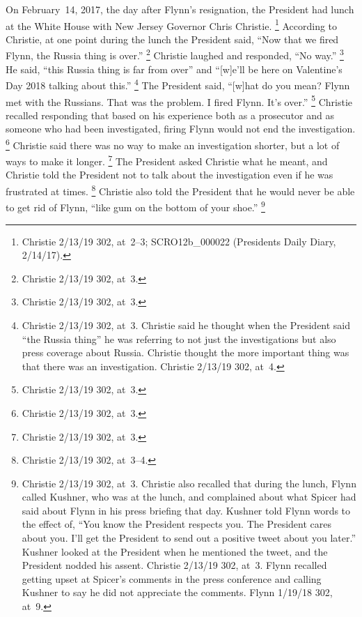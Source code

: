 On February~14, 2017, the day after Flynn's resignation, the President had lunch at the White House with New Jersey Governor Chris Christie.%
\footnote{Christie 2/13/19 302, at~2--3;
SCRO12b\_000022 (Presidents Daily Diary, 2/14/17).}
According to Christie, at one point during the lunch the President said, ``Now that we fired Flynn, the Russia thing is over.''%
\footnote{Christie 2/13/19 302, at~3.}
Christie laughed and responded, ``No way.''%
\footnote{Christie 2/13/19 302, at~3.}
He said, ``this Russia thing is far from over'' and ``[w]e'll be here on Valentine's Day 2018 talking about this.''%
\footnote{Christie 2/13/19 302, at~3.
Christie said he thought when the President said ``the Russia thing'' he was referring to not just the investigations but also press coverage about Russia.
Christie thought the more important thing was that there was an investigation.
Christie 2/13/19 302, at~4.}
The President said, ``[w]hat do you mean?
Flynn met with the Russians.
That was the problem.
I fired Flynn.
It's over.''%
\footnote{Christie 2/13/19 302, at~3.}
Christie recalled responding that based on his experience both as a prosecutor and as someone who had been investigated, firing Flynn would not end the investigation.%
\footnote{Christie 2/13/19 302, at~3.}
Christie said there was no way to make an investigation shorter, but a lot of ways to make it longer.%
\footnote{Christie 2/13/19 302, at~3.}
The President asked Christie what he meant, and Christie told the President not to talk about the investigation even if he was frustrated at times.%
\footnote{Christie 2/13/19 302, at~3--4.}
Christie also told the President that he would never be able to get rid of Flynn, ``like gum on the bottom of your shoe.''%
\footnote{Christie 2/13/19 302, at~3.
Christie also recalled that during the lunch, Flynn called Kushner, who was at the lunch, and complained about what Spicer had said about Flynn in his press briefing that day.
Kushner told Flynn words to the effect of, ``You know the President respects you.
The President cares about you.
I'll get the President to send out a positive tweet about you later.''
Kushner looked at the President when he mentioned the tweet, and the President nodded his assent.
Christie 2/13/19 302, at~3.
Flynn recalled getting upset at Spicer's comments in the press conference and calling Kushner to say he did not appreciate the comments.
Flynn 1/19/18 302, at~9.}

